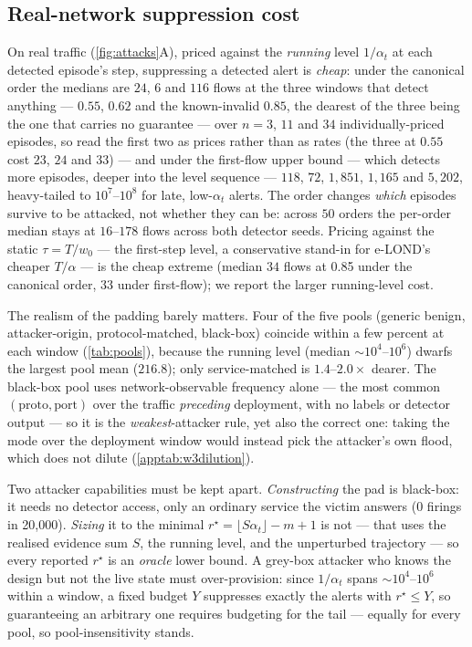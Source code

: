 \documentclass[conference]{IEEEtran}
\newcommand{\alphat}{\alpha_t}
\begin{document}
\subsection{Real-network suppression cost}\label{sec:paddingcost}

On real traffic (\cref{fig:attacks}A), priced against the \emph{running} level $1/\alphat$ at each
detected episode's step, suppressing a detected alert is \emph{cheap}: under the canonical order the
medians are $24$, $6$ and $116$ flows at the three windows that detect anything --- $0.55$, $0.62$
and the known-invalid $0.85$, the dearest of the three being the one that carries no guarantee ---
over $n=3$, $11$
and $34$ individually-priced episodes, so read the first two as prices rather than as rates
(the three at $0.55$ cost $23$, $24$ and $33$) --- and under the
first-flow upper bound --- which detects more episodes, deeper into the level sequence --- $118$, $72$,
$1{,}851$, $1{,}165$ and $5{,}202$, heavy-tailed to $10^{7}$--$10^{8}$ for late, low-$\alphat$ alerts.
The order changes \emph{which} episodes survive to be attacked, not whether they can be: across $50$
orders the per-order median stays at $16$--$178$ flows across both detector seeds. Pricing against the static $\tau = T/w_0$ ---
the first-step level, a conservative stand-in for e-LOND's cheaper $T/\alpha$ --- is the cheap extreme
(median $34$ flows at 0.85 under the canonical order, $33$ under first-flow); we report the
larger running-level cost.

The realism of the padding barely matters. Four of the five pools (generic benign, attacker-origin,
protocol-matched, black-box) coincide within a few percent at each window
(\cref{tab:pools}), because the running level (median $\sim\!10^{4}$--$10^{6}$) dwarfs the largest pool
mean ($216.8$); only service-matched is $1.4$--$2.0\times$ dearer. The black-box pool uses
network-observable frequency alone --- the most common $(\text{proto},\text{port})$ over the traffic
\emph{preceding} deployment, with no labels or detector output --- so it is the \emph{weakest}-attacker
rule, yet also the correct one: taking the mode over the deployment window would instead pick the
attacker's own flood, which does not dilute (\cref{apptab:w3dilution}).

Two attacker capabilities must be kept apart. \emph{Constructing} the pad is black-box: it needs no
detector access, only an ordinary service the victim answers (0 firings in 20{,}000). \emph{Sizing} it
to the minimal $r^{\star}=\lfloor S\alphat\rfloor-m+1$ is not --- that uses the realised evidence sum
$S$, the running level, and the unperturbed trajectory --- so every reported $r^{\star}$ is an
\emph{oracle} lower bound. A grey-box attacker who knows the design but not the live state must
over-provision: since $1/\alphat$ spans $\sim\!10^{4}$--$10^{6}$ within a window, a fixed budget $Y$
suppresses exactly the alerts with $r^{\star}\le Y$, so guaranteeing an arbitrary one requires
budgeting for the tail --- equally for every pool, so pool-insensitivity stands.
\end{document}

